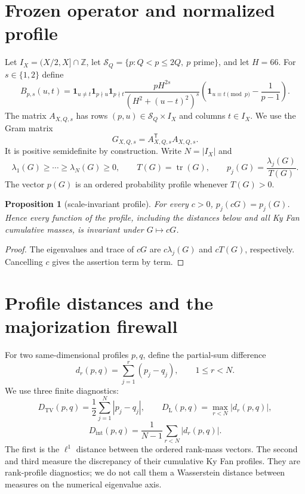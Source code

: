 \documentclass[10pt]{article}
\newtheorem{proposition}{Proposition}
\newcommand{\tr}{\operatorname{tr}}
\newcommand{\TV}{D_{\mathrm{TV}}}
\newcommand{\DL}{D_{\mathrm{L}}}
\newcommand{\DI}{D_{\mathrm{int}}}
\begin{document}
\section{Frozen operator and normalized profile}

Let $I_X=(X/2,X]\cap\mathbb Z$, let
$\mathcal S_Q=\{p:Q<p\leq2Q,\ p\text{ prime}\}$, and let $H=66$.  For
$s\in\{1,2\}$ define
\begin{equation}
 B_{p,s}(u,t)=\mathbf 1_{u\ne t}\mathbf 1_{p\nmid u}\mathbf 1_{p\nmid t}
 \frac{pH^{2s}}{(H^2+(u-t)^2)^s}
 \left(\mathbf 1_{u\equiv t\pmod p}-\frac{1}{p-1}\right).
 \label{eq:block}
\end{equation}
The matrix $A_{X,Q,s}$ has rows $(p,u)\in\mathcal S_Q\times I_X$ and
columns $t\in I_X$.  We use the Gram matrix
\begin{equation}
 G_{X,Q,s}=A_{X,Q,s}^{\mathsf T}A_{X,Q,s}.
 \label{eq:gram}
\end{equation}
It is positive semidefinite by construction.  Write $N=|I_X|$ and
\[
 \lambda_1(G)\geq\cdots\geq\lambda_N(G)\geq0,\qquad
 T(G)=\tr(G),\qquad p_j(G)=\frac{\lambda_j(G)}{T(G)}.
\]
The vector $p(G)$ is an ordered probability profile whenever $T(G)>0$.

\begin{proposition}[scale-invariant profile]
For every $c>0$, $p_j(cG)=p_j(G)$.  Hence every function of the profile,
including the distances below and all Ky Fan cumulative masses, is invariant
under $G\mapsto cG$.
\end{proposition}
\begin{proof}
The eigenvalues and trace of $cG$ are $c\lambda_j(G)$ and $cT(G)$,
respectively.  Cancelling $c$ gives the assertion term by term.
\end{proof}

\section{Profile distances and the majorization firewall}

For two same-dimensional profiles $p,q$, define the partial-sum difference
\[
 d_r(p,q)=\sum_{j=1}^r(p_j-q_j),\qquad 1\leq r<N.
\]
We use three finite diagnostics:
\begin{equation}
 \TV(p,q)=\frac12\sum_{j=1}^N|p_j-q_j|,\qquad
 \DL(p,q)=\max_{r<N}|d_r(p,q)|,
 \label{eq:dist}
\end{equation}
\begin{equation}
 \DI(p,q)=\frac1{N-1}\sum_{r<N}|d_r(p,q)|.
 \label{eq:integrated}
\end{equation}
The first is the $\ell^1$ distance between the ordered rank-mass vectors.  The
second and third measure the discrepancy of their cumulative Ky Fan profiles.
They are rank-profile diagnostics; we do not call them a Wasserstein distance
between measures on the numerical eigenvalue axis.
\end{document}
